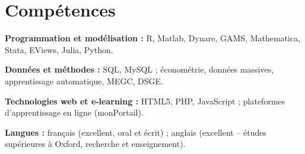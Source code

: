 \documentclass[11pt,letterpaper]{article}
\begin{document}
\section{Compétences}
\begin{plainlist}
  \item \textbf{Programmation et modélisation :} R, Matlab, Dynare, GAMS, Mathematica, Stata, EViews, Julia, Python.
  \item \textbf{Données et méthodes :} SQL, MySQL ; économétrie, données massives, apprentissage automatique, MEGC, DSGE.
  \item \textbf{Technologies web et e-learning :} HTML5, PHP, JavaScript ; plateformes d'apprentissage en ligne (monPortail).
  \item \textbf{Langues :} français (excellent, oral et écrit) ; anglais (excellent -- études supérieures à Oxford, recherche et enseignement).
\end{plainlist}
\end{document}

